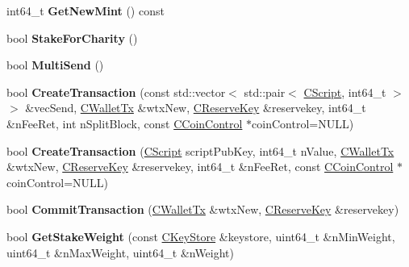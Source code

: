 \begin{DoxyCompactItemize}
\mbox{\label{class_c_wallet_aa9f9ec9a50d08cfd6a7897d7ba1b2d75}} 
int64\+\_\+t {\bfseries Get\+New\+Mint} () const
\item 
\mbox{\label{class_c_wallet_a7dc39cec6ccacacfe71eea6210ee9f27}} 
bool {\bfseries Stake\+For\+Charity} ()
\item 
\mbox{\label{class_c_wallet_ace77e9b4ffcfdbc61a327d02168620a2}} 
bool {\bfseries Multi\+Send} ()
\item 
\mbox{\label{class_c_wallet_a58c03c107801075caea4e4bd1058fcb6}} 
bool {\bfseries Create\+Transaction} (const std\+::vector$<$ std\+::pair$<$ \mbox{\hyperlink{class_c_script}{C\+Script}}, int64\+\_\+t $>$ $>$ \&vec\+Send, \mbox{\hyperlink{class_c_wallet_tx}{C\+Wallet\+Tx}} \&wtx\+New, \mbox{\hyperlink{class_c_reserve_key}{C\+Reserve\+Key}} \&reservekey, int64\+\_\+t \&n\+Fee\+Ret, int n\+Split\+Block, const \mbox{\hyperlink{class_c_coin_control}{C\+Coin\+Control}} $\ast$coin\+Control=N\+U\+LL)
\item 
\mbox{\label{class_c_wallet_a4b40b2b8fdb3fc9f848c5a8d3cae21ef}} 
bool {\bfseries Create\+Transaction} (\mbox{\hyperlink{class_c_script}{C\+Script}} script\+Pub\+Key, int64\+\_\+t n\+Value, \mbox{\hyperlink{class_c_wallet_tx}{C\+Wallet\+Tx}} \&wtx\+New, \mbox{\hyperlink{class_c_reserve_key}{C\+Reserve\+Key}} \&reservekey, int64\+\_\+t \&n\+Fee\+Ret, const \mbox{\hyperlink{class_c_coin_control}{C\+Coin\+Control}} $\ast$coin\+Control=N\+U\+LL)
\item 
\mbox{\label{class_c_wallet_ac30e619488120651a6753195b77f3ad8}} 
bool {\bfseries Commit\+Transaction} (\mbox{\hyperlink{class_c_wallet_tx}{C\+Wallet\+Tx}} \&wtx\+New, \mbox{\hyperlink{class_c_reserve_key}{C\+Reserve\+Key}} \&reservekey)
\item 
\mbox{\label{class_c_wallet_ad30f7bae633ec35e067d8e383be19534}} 
bool {\bfseries Get\+Stake\+Weight} (const \mbox{\hyperlink{class_c_key_store}{C\+Key\+Store}} \&keystore, uint64\+\_\+t \&n\+Min\+Weight, uint64\+\_\+t \&n\+Max\+Weight, uint64\+\_\+t \&n\+Weight)
\item 
\mbox{\label{class_c_wallet_a99a70545583b75be7fe4bc35cc4ae454}} 

\end{DoxyCompactItemize}
